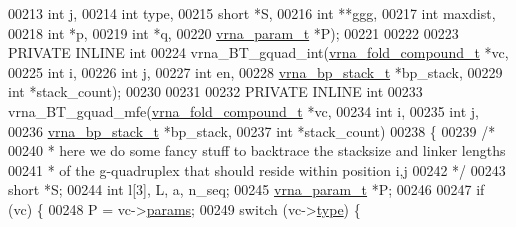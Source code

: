 \begin{DoxyCode}
00213                                              \textcolor{keywordtype}{int}          j,
00214                                              \textcolor{keywordtype}{int}          type,
00215                                              \textcolor{keywordtype}{short}        *S,
00216                                              \textcolor{keywordtype}{int}          **ggg,
00217                                              \textcolor{keywordtype}{int}          maxdist,
00218                                              \textcolor{keywordtype}{int}          *p,
00219                                              \textcolor{keywordtype}{int}          *q,
00220                                              \hyperlink{group__energy__parameters_structvrna__param__s}{vrna\_param\_t} *P);
00221 
00222 
00223 PRIVATE INLINE \textcolor{keywordtype}{int}
00224 vrna\_BT\_gquad\_int(\hyperlink{group__fold__compound_structvrna__fc__s}{vrna\_fold\_compound\_t}  *vc,
00225                   \textcolor{keywordtype}{int}                   i,
00226                   \textcolor{keywordtype}{int}                   j,
00227                   \textcolor{keywordtype}{int}                   en,
00228                   \hyperlink{group__data__structures_structvrna__bp__stack__s}{vrna\_bp\_stack\_t}       *bp\_stack,
00229                   \textcolor{keywordtype}{int}                   *stack\_count);
00230 
00231 
00232 PRIVATE INLINE \textcolor{keywordtype}{int}
00233 vrna\_BT\_gquad\_mfe(\hyperlink{group__fold__compound_structvrna__fc__s}{vrna\_fold\_compound\_t}  *vc,
00234                   \textcolor{keywordtype}{int}                   i,
00235                   \textcolor{keywordtype}{int}                   j,
00236                   \hyperlink{group__data__structures_structvrna__bp__stack__s}{vrna\_bp\_stack\_t}       *bp\_stack,
00237                   \textcolor{keywordtype}{int}                   *stack\_count)
00238 \{
00239   \textcolor{comment}{/*}
00240 \textcolor{comment}{   * here we do some fancy stuff to backtrace the stacksize and linker lengths}
00241 \textcolor{comment}{   * of the g-quadruplex that should reside within position i,j}
00242 \textcolor{comment}{   */}
00243   \textcolor{keywordtype}{short}         *S;
00244   \textcolor{keywordtype}{int}           l[3], L, a, n\_seq;
00245   \hyperlink{group__energy__parameters_structvrna__param__s}{vrna\_param\_t}  *P;
00246 
00247   \textcolor{keywordflow}{if} (vc) \{
00248     P = vc->\hyperlink{group__fold__compound_a19b8720c2c5321c1b97c830bd17566ea}{params};
00249     \textcolor{keywordflow}{switch} (vc->\hyperlink{group__fold__compound_a391bcf8ac5997784aaf780cdd251c464}{type}) \{

\end{DoxyCode}
